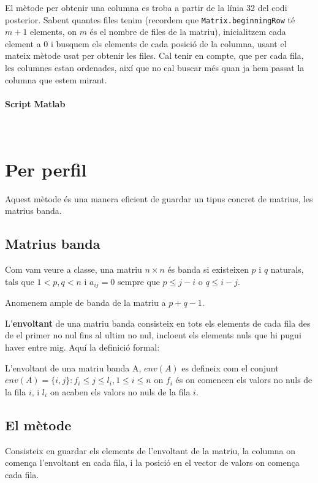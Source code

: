 \documentclass[11pt,a4paper,twoside]{report}
\begin{document}
El mètode per obtenir una columna es troba a partir de la línia 32 del codi posterior. Sabent quantes files tenim (recordem que \texttt{Matrix.beginningRow} té $m+1$ elements, on $m$ és el nombre de files de la matriu), inicialitzem cada element a 0 i busquem els elements de cada posició de la columna, usant el mateix mètode usat per obtenir les files. Cal tenir en compte, que per cada fila, les columnes estan ordenades, així que no cal buscar més quan ja hem passat la columna que estem mirant.

\paragraph*{Script Matlab} \mbox{} \\




\section{Per perfil}

 
 Aquest mètode és una manera eficient de guardar un tipus concret de matrius, les matrius banda.
 
\subsection{Matrius banda}	 

Com vam veure a classe, 
una matriu $n \times n$ és banda si existeixen $p$ i $q$ naturals, tals que $1< p, q < n$  i $a_{i j} = 0$ sempre que $p \leq j - i$ o $q \leq i-j$. 

Anomenem ample de banda de la matriu a $p + q - 1$.

L'\textbf{envoltant} de una matriu banda consisteix en tots els elements de cada fila des de el primer no nul fins al ultim no nul, incloent els elements nuls que hi pugui haver entre mig.  Aquí la definició formal:

L'envoltant de una matriu banda A, $env(A)$ es defineix com el conjunt $env(A) = \{i, j\} : f_i \leq j \leq l_i, 1 \leq i \leq n $ on $f_i$ és on comencen els valors no nuls de la fila $i$, i $l_i$ on acaben els valors no nuls de la fila $i$.

 \subsection{El mètode}
 
 Consisteix en guardar els elements de l'envoltant de la matriu, la columna on comença l'envoltant en cada fila, i la posició en el vector de valors on comença cada fila.
 
\end{document}
